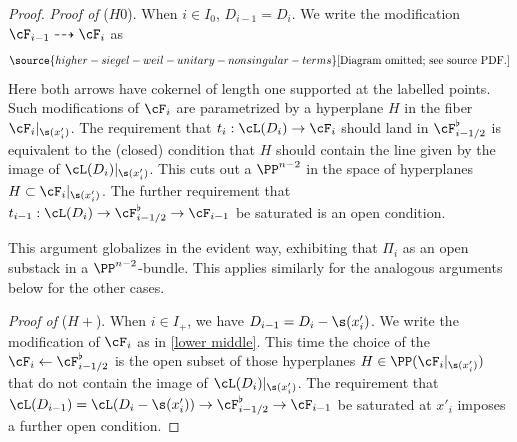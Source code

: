 \begin{proof}
\emph{Proof of }($H0$). When $i\in I_{0}$, $D_{i-1}=D_{i}$. We write the modification $\cF_{i-1}\dashrightarrow\cF_{i}$ as
\begin{equation}\label{lower middle}
\source{higher-siegel-weil-unitary-nonsingular-terms}
\text{[Diagram omitted; see source PDF.]}
\end{equation}
Here both arrows have cokernel of length one supported at the labelled points. Such modifications of $\cF_{i}$ are parametrized by a hyperplane $H$ in the fiber $\cF_{i}|_{\s(x'_{i})}$.
The requirement that $t_{i}:\cL(D_{i})\to \cF_{i}$ should land in $\cF^{\flat}_{i-1/2}$ is equivalent to the (closed) condition that $H$ should contain the line given by the image of $\cL(D_{i})|_{\s(x'_{i})}$. This cuts out a $\PP^{n-2}$ in the space of hyperplanes $H \subset \cF_{i}|_{\s(x'_{i})}$. The further requirement that $t_{i-1}:\cL(D_{i})\to \cF^{\flat}_{i-1/2}\to \cF_{i-1}$ be saturated is an open condition.

This argument globalizes in the evident way, exhibiting that $\Pi_i$ as an open substack in a $\PP^{n-2}$-bundle. This applies similarly for the analogous arguments below for the other cases.


\emph{Proof of} ($H+$). When $i\in I_{+}$, we have $D_{i-1}=D_{i}-\s(x'_{i})$. We write the modification of $\cF_{i}$ as in \eqref{lower middle}. This time the choice of the $\cF_{i}\leftarrow\cF^{\flat}_{i-1/2}$ is the open subset of those hyperplanes $H\in \PP(\cF_{i}|_{\s(x'_{i})})$ that do not contain the image of $\cL(D_{i})|_{\s(x'_{i})}$. The requirement that $\cL(D_{i-1})=\cL(D_{i}-\s(x'_{i}))\to \cF^{\flat}_{i-1/2}\to \cF_{i-1}$ be saturated at $x'_{i}$ imposes a further open condition.


\end{proof}
